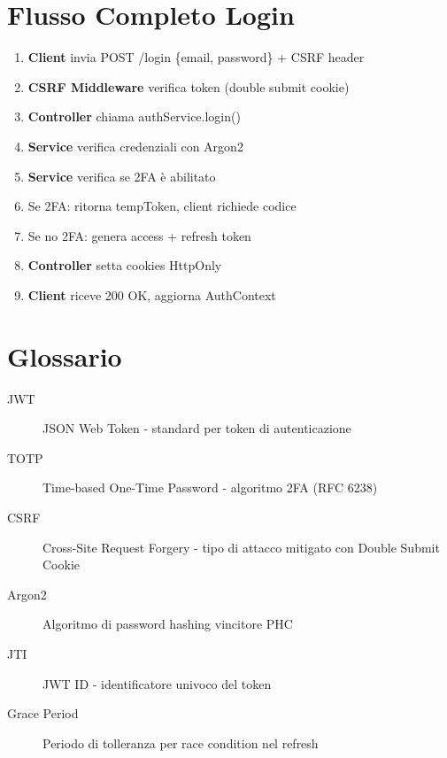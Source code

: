 \documentclass[11pt,a4paper]{article}
\begin{document}
\section{Flusso Completo Login}

\begin{enumerate}
    \item \textbf{Client} invia POST /login \{email, password\} + CSRF header
    \item \textbf{CSRF Middleware} verifica token (double submit cookie)
    \item \textbf{Controller} chiama authService.login()
    \item \textbf{Service} verifica credenziali con Argon2
    \item \textbf{Service} verifica se 2FA è abilitato
    \item Se 2FA: ritorna tempToken, client richiede codice
    \item Se no 2FA: genera access + refresh token
    \item \textbf{Controller} setta cookies HttpOnly
    \item \textbf{Client} riceve 200 OK, aggiorna AuthContext
\end{enumerate}

\section{Glossario}

\begin{description}
    \item[JWT] JSON Web Token - standard per token di autenticazione
    \item[TOTP] Time-based One-Time Password - algoritmo 2FA (RFC 6238)
    \item[CSRF] Cross-Site Request Forgery - tipo di attacco mitigato con Double Submit Cookie
    \item[Argon2] Algoritmo di password hashing vincitore PHC
    \item[JTI] JWT ID - identificatore univoco del token
    \item[Grace Period] Periodo di tolleranza per race condition nel refresh
\end{description}
\end{document}

